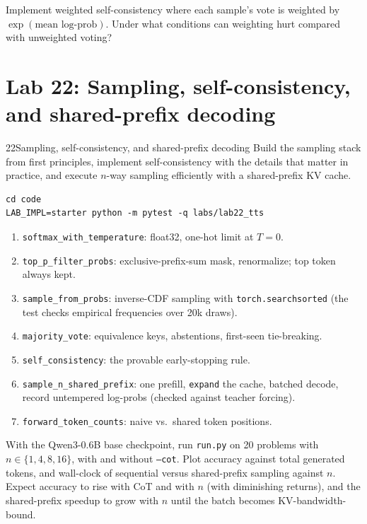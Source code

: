 \begin{exercise}
Implement weighted self-consistency where each sample's vote is weighted by
$\exp(\text{mean log-prob})$. Under what conditions can weighting hurt compared with unweighted
voting?
\end{exercise}

\section{Lab 22: Sampling, self-consistency, and shared-prefix decoding}\label{sec:scaling:lab}

\begin{labbox}{22}{Sampling, self-consistency, and shared-prefix decoding}
Build the sampling stack from first principles, implement self-consistency with the details that
matter in practice, and execute $n$-way sampling efficiently with a shared-prefix KV cache.

\begin{lstlisting}[style=shell]
cd code
LAB_IMPL=starter python -m pytest -q labs/lab22_tts
\end{lstlisting}

\begin{enumerate}
  \item \texttt{softmax\_with\_temperature}: float32, one-hot limit at $T=0$.
  \item \texttt{top\_p\_filter\_probs}: exclusive-prefix-sum mask, renormalize; top token always kept.
  \item \texttt{sample\_from\_probs}: inverse-CDF sampling with \texttt{torch.searchsorted} (the
  test checks empirical frequencies over 20k draws).
  \item \texttt{majority\_vote}: equivalence keys, abstentions, first-seen tie-breaking.
  \item \texttt{self\_consistency}: the provable early-stopping rule.
  \item \texttt{sample\_n\_shared\_prefix}: one prefill, \texttt{expand} the cache, batched decode,
  record untempered log-probs (checked against teacher forcing).
  \item \texttt{forward\_token\_counts}: naive vs.\ shared token positions.
\end{enumerate}

With the Qwen3-0.6B base checkpoint, run \texttt{run.py} on 20 problems with $n \in \{1,4,8,16\}$,
with and without \texttt{--cot}. Plot accuracy against total generated tokens, and wall-clock of
sequential versus shared-prefix sampling against $n$. Expect accuracy to rise with CoT and with $n$
(with diminishing returns), and the shared-prefix speedup to grow with $n$ until the batch becomes
KV-bandwidth-bound.


\end{labbox}
